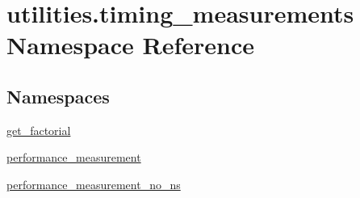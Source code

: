 \hypertarget{namespaceutilities_1_1timing__measurements}{}\section{utilities.\+timing\+\_\+measurements Namespace Reference}
\label{namespaceutilities_1_1timing__measurements}
\subsection*{Namespaces}
\begin{DoxyCompactItemize}
\item 
 \hyperlink{namespaceutilities_1_1timing__measurements_1_1get__factorial}{get\+\_\+factorial}
\item 
 \hyperlink{namespaceutilities_1_1timing__measurements_1_1performance__measurement}{performance\+\_\+measurement}
\item 
 \hyperlink{namespaceutilities_1_1timing__measurements_1_1performance__measurement__no__ns}{performance\+\_\+measurement\+\_\+no\+\_\+ns}
\end{DoxyCompactItemize}
